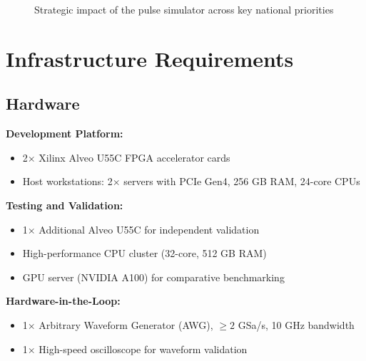 \documentclass[12pt,a4paper]{article}
\begin{document}
\begin{figure}[htbp]
\caption{Strategic impact of the pulse simulator across key national priorities}
\label{fig:impact}
\end{figure}

\newpage
\section{Infrastructure Requirements}

\subsection{Hardware}

\textbf{Development Platform:}
\begin{itemize}[noitemsep]
    \item 2$\times$ Xilinx Alveo U55C FPGA accelerator cards
    \item Host workstations: 2$\times$ servers with PCIe Gen4, 256 GB RAM, 24-core CPUs
\end{itemize}

\textbf{Testing and Validation:}
\begin{itemize}[noitemsep]
    \item 1$\times$ Additional Alveo U55C for independent validation
    \item High-performance CPU cluster (32-core, 512 GB RAM)
    \item GPU server (NVIDIA A100) for comparative benchmarking
\end{itemize}

\textbf{Hardware-in-the-Loop:}
\begin{itemize}[noitemsep]
    \item 1$\times$ Arbitrary Waveform Generator (AWG), $\geq 2$ GSa/s, 10 GHz bandwidth
    \item 1$\times$ High-speed oscilloscope for waveform validation
\end{itemize}
\end{document}

